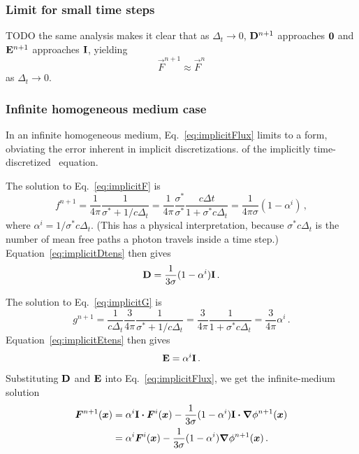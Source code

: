 \subsubsection{Limit for small time steps}
TODO the same analysis makes it clear that as $\Delta_t \to 0$,
$\mathbf{D}^{n+1}$ approaches $\mathbf{0}$ and $\mathbf{E}^{n+1}$ approaches $\mathbf{I}$,
yielding
\begin{equation*}
  \vec{F}^{n+1} \approx \vec{F}^{n}
\end{equation*}
as $\Delta_t \to 0$.

\subsubsection{Infinite homogeneous medium case}
In an infinite homogeneous medium, Eq.~\eqref{eq:implicitFlux} limits to a
form, obviating the error inherent in implicit discretizations.
of the implicitly time-discretized \Pone\ equation.

The solution to Eq.~\eqref{eq:implicitF} is
\begin{equation*}
  f^{n+1}
  = \frac{1}{4\pi} \frac{1}{\sigma^\ast + 1 /c \Delta_t}
  = \frac{1}{4\pi} \frac{\sigma^\ast}{\sigma^\ast} \frac{c \Delta t}{1 + \sigma^\ast c \Delta_t}
  = \frac{1}{4\pi \sigma} ( 1 - \alpha^i) \,,
\end{equation*}
where $\alpha^i = 1/ \sigma^\ast c \Delta_t$. (This has a physical
interpretation, because $\sigma^\ast c \Delta_t$ is the number of mean free
paths a photon travels inside a time step.) Equation~\eqref{eq:implicitDtens}
then gives
\begin{equation*}
  \mathbf{D} = \frac{1}{3 \sigma} ( 1 - \alpha^i) \mathbf{I}\,.
\end{equation*}

The solution to Eq.~\eqref{eq:implicitG} is
\begin{equation*}
  g^{n+1}
  = \frac{1}{c \Delta_t} \frac{3}{4\pi} \frac{1}{\sigma^\ast + 1 /c \Delta_t}
  = \frac{3}{4\pi} \frac{1}{1 + \sigma^\ast c \Delta_t}
  = \frac{3}{4\pi} \alpha^i \,.
\end{equation*}
Equation~\eqref{eq:implicitEtens} then gives
\begin{equation*}
  \mathbf{E} = \alpha^i \mathbf{I}\,.
\end{equation*}

Substituting $\mathbf{D}$ and $\mathbf{E}$ into Eq.~\eqref{eq:implicitFlux}, we get the
infinite-medium solution
\begin{align*}
  \bm{F}^{n+1}(\bm{x})
  &= \alpha^i \mathbf{I} \bm{\cdot} \bm{F}^i(\bm{x})
  - \frac{1}{3 \sigma} ( 1 - \alpha^i) \mathbf{I} \bm{\cdot} \bm{\nabla} \phi^{n+1} (\bm{x}) 
  \\
  &= \alpha^i \bm{F}^i(\bm{x})
  - \frac{1}{3 \sigma} ( 1 - \alpha^i) \bm{\nabla} \phi^{n+1} (\bm{x})\,.
\end{align*}

